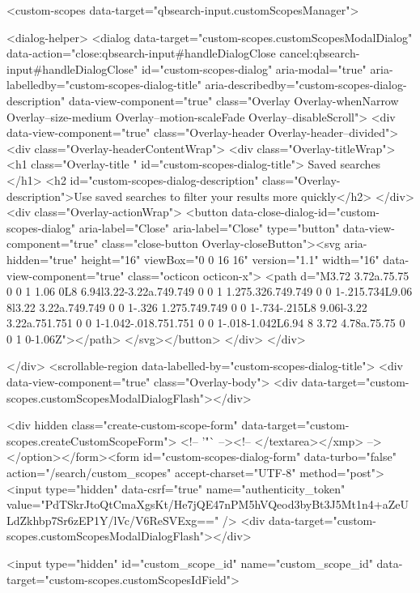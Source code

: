     <custom-scopes data-target="qbsearch-input.customScopesManager">
    
<dialog-helper>
  <dialog data-target="custom-scopes.customScopesModalDialog" data-action="close:qbsearch-input#handleDialogClose cancel:qbsearch-input#handleDialogClose" id="custom-scopes-dialog" aria-modal="true" aria-labelledby="custom-scopes-dialog-title" aria-describedby="custom-scopes-dialog-description" data-view-component="true" class="Overlay Overlay-whenNarrow Overlay--size-medium Overlay--motion-scaleFade Overlay--disableScroll">
    <div data-view-component="true" class="Overlay-header Overlay-header--divided">
  <div class="Overlay-headerContentWrap">
    <div class="Overlay-titleWrap">
      <h1 class="Overlay-title " id="custom-scopes-dialog-title">
        Saved searches
      </h1>
        <h2 id="custom-scopes-dialog-description" class="Overlay-description">Use saved searches to filter your results more quickly</h2>
    </div>
    <div class="Overlay-actionWrap">
      <button data-close-dialog-id="custom-scopes-dialog" aria-label="Close" aria-label="Close" type="button" data-view-component="true" class="close-button Overlay-closeButton"><svg aria-hidden="true" height="16" viewBox="0 0 16 16" version="1.1" width="16" data-view-component="true" class="octicon octicon-x">
    <path d="M3.72 3.72a.75.75 0 0 1 1.06 0L8 6.94l3.22-3.22a.749.749 0 0 1 1.275.326.749.749 0 0 1-.215.734L9.06 8l3.22 3.22a.749.749 0 0 1-.326 1.275.749.749 0 0 1-.734-.215L8 9.06l-3.22 3.22a.751.751 0 0 1-1.042-.018.751.751 0 0 1-.018-1.042L6.94 8 3.72 4.78a.75.75 0 0 1 0-1.06Z"></path>
</svg></button>
    </div>
  </div>
  
</div>
      <scrollable-region data-labelled-by="custom-scopes-dialog-title">
        <div data-view-component="true" class="Overlay-body">        <div data-target="custom-scopes.customScopesModalDialogFlash"></div>

        <div hidden class="create-custom-scope-form" data-target="custom-scopes.createCustomScopeForm">
        <!-- '"` --><!-- </textarea></xmp> --></option></form><form id="custom-scopes-dialog-form" data-turbo="false" action="/search/custom_scopes" accept-charset="UTF-8" method="post"><input type="hidden" data-csrf="true" name="authenticity_token" value="PdTSkrJtoQtCmaXgsKt/He7jQE47nPM5hVQeod3byBt3J5Mt1n4+aZeULdZkhbp7Sr6zEP1Y/lVc/V6ReSVExg==" />
          <div data-target="custom-scopes.customScopesModalDialogFlash"></div>

          <input type="hidden" id="custom_scope_id" name="custom_scope_id" data-target="custom-scopes.customScopesIdField">

